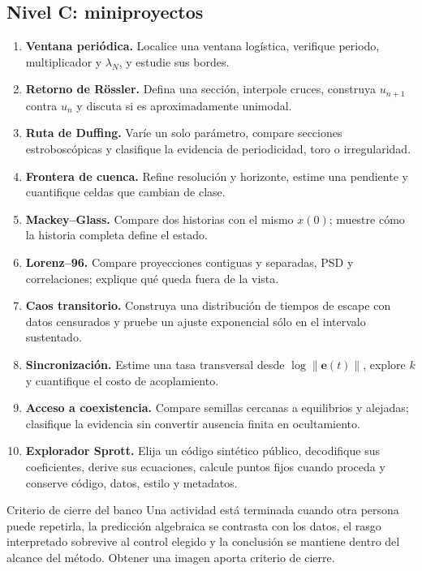 \subsection*{Nivel C: miniproyectos}
\begin{enumerate}
  \item[C1.] \textbf{Ventana periódica.} Localice una ventana logística, verifique
  periodo, multiplicador y \(\lambda_N\), y estudie sus bordes.
  \item[C2.] \textbf{Retorno de Rössler.} Defina una sección, interpole cruces,
  construya \(u_{n+1}\) contra \(u_n\) y discuta si es aproximadamente unimodal.
  \item[C3.] \textbf{Ruta de Duffing.} Varíe un solo parámetro, compare secciones
  estroboscópicas y clasifique la evidencia de periodicidad, toro o irregularidad.
  \item[C4.] \textbf{Frontera de cuenca.} Refine resolución y horizonte, estime una
  pendiente y cuantifique celdas que cambian de clase.
  \item[C5.] \textbf{Mackey--Glass.} Compare dos historias con el mismo \(x(0)\);
  muestre cómo la historia completa define el estado.
  \item[C6.] \textbf{Lorenz--96.} Compare proyecciones contiguas y separadas, PSD y
  correlaciones; explique qué queda fuera de la vista.
  \item[C7.] \textbf{Caos transitorio.} Construya una distribución de tiempos de
  escape con datos censurados y pruebe un ajuste exponencial sólo en el intervalo
  sustentado.
  \item[C8.] \textbf{Sincronización.} Estime una tasa transversal desde
  \(\log\|\mathbf e(t)\|\), explore \(k\) y cuantifique el costo de acoplamiento.
  \item[C9.] \textbf{Acceso a coexistencia.} Compare semillas cercanas a equilibrios
  y alejadas; clasifique la evidencia sin convertir ausencia finita en ocultamiento.
  \item[C10.] \textbf{Explorador Sprott.} Elija un código sintético público,
  decodifique sus coeficientes, derive sus ecuaciones, calcule puntos fijos cuando
  proceda y conserve código, datos, estilo y metadatos.
\end{enumerate}

\begin{evidencebox}{Criterio de cierre del banco}
Una actividad está terminada cuando otra persona puede repetirla, la predicción
algebraica se contrasta con los datos, el rasgo interpretado sobrevive al control
elegido y la conclusión se mantiene dentro del alcance del método. Obtener una imagen aporta
criterio de cierre.
\end{evidencebox}

